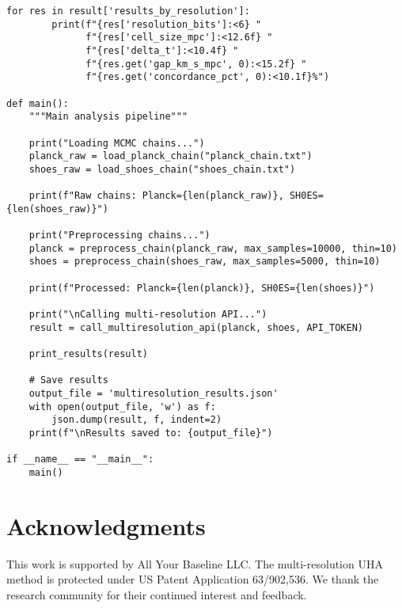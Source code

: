 \documentclass[11pt]{article}
\begin{document}
\begin{lstlisting}[style=python, caption={Production-ready implementation}]
    for res in result['results_by_resolution']:
        print(f"{res['resolution_bits']:<6} "
              f"{res['cell_size_mpc']:<12.6f} "
              f"{res['delta_t']:<10.4f} "
              f"{res.get('gap_km_s_mpc', 0):<15.2f} "
              f"{res.get('concordance_pct', 0):<10.1f}%")

def main():
    """Main analysis pipeline"""

    print("Loading MCMC chains...")
    planck_raw = load_planck_chain("planck_chain.txt")
    shoes_raw = load_shoes_chain("shoes_chain.txt")

    print(f"Raw chains: Planck={len(planck_raw)}, SH0ES={len(shoes_raw)}")

    print("Preprocessing chains...")
    planck = preprocess_chain(planck_raw, max_samples=10000, thin=10)
    shoes = preprocess_chain(shoes_raw, max_samples=5000, thin=10)

    print(f"Processed: Planck={len(planck)}, SH0ES={len(shoes)}")

    print("\nCalling multi-resolution API...")
    result = call_multiresolution_api(planck, shoes, API_TOKEN)

    print_results(result)

    # Save results
    output_file = 'multiresolution_results.json'
    with open(output_file, 'w') as f:
        json.dump(result, f, indent=2)
    print(f"\nResults saved to: {output_file}")

if __name__ == "__main__":
    main()
\end{lstlisting}

\section{Acknowledgments}

This work is supported by All Your Baseline LLC. The multi-resolution UHA method is protected under US Patent Application 63/902,536. We thank the research community for their continued interest and feedback.
\end{document}
